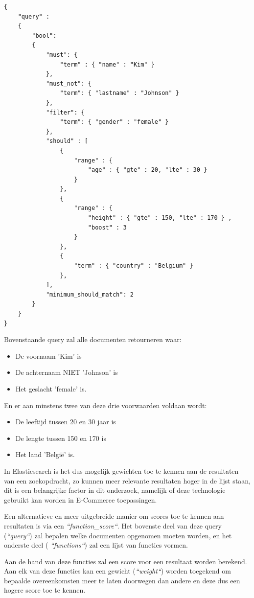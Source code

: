 \begin{lstlisting}[caption={Combineren: Voorbeeld van een 'bool' query}]
{
	"query" : 
	{
		"bool": 
		{
			"must": {
				"term" : { "name" : "Kim" }
			},
			"must_not": {
				"term": { "lastname" : "Johnson" }
			},
			"filter": {
				"term": { "gender" : "female" }
			},
			"should" : [
				{
					"range" : {
						"age" : { "gte" : 20, "lte" : 30 }
					}
				},
				{
					"range" : {
						"height" : { "gte" : 150, "lte" : 170 } ,
						"boost" : 3
					}
				},
				{
					"term" : { "country" : "Belgium" }
				},
			],
			"minimum_should_match": 2
		}
	}
}
\end{lstlisting}
 
Bovenstaande query zal alle documenten retourneren waar: 
\begin{itemize}
	\setlength\itemsep{.3em}
	\item De voornaam 'Kim' is
	\item De achternaam NIET 'Johnson' is
	\item Het geslacht 'female' is.
\end{itemize}

En er aan minstens twee van deze drie voorwaarden voldaan wordt: 
\begin{itemize}
	\setlength\itemsep{.3em}
	\item De leeftijd tussen 20 en 30 jaar is
	\item De lengte tussen 150 en 170 is
	\item Het land 'België' is.
\end{itemize}


\newpage
In Elasticsearch is het dus mogelijk gewichten toe te kennen aan de resultaten van een zoekopdracht, zo kunnen meer relevante resultaten hoger in de lijst staan, dit is een belangrijke factor in dit onderzoek, namelijk of deze technologie gebruikt kan worden in E-Commerce toepassingen.

Een alternatieve en meer uitgebreide manier om scores toe te kennen aan resultaten is via een \textit{``function\_score``}. Het bovenste deel van deze query (\textit{``query``}) zal bepalen welke documenten opgenomen moeten worden, en het onderste deel ( \textit{``functions``}) zal een lijst van functies vormen. 

Aan de hand van deze functies zal een score voor een resultaat worden berekend. Aan elk van deze functies kan een gewicht (\textit{``weight``}) worden toegekend om bepaalde overeenkomsten meer te laten doorwegen dan andere en deze dus een hogere score toe te kennen.

